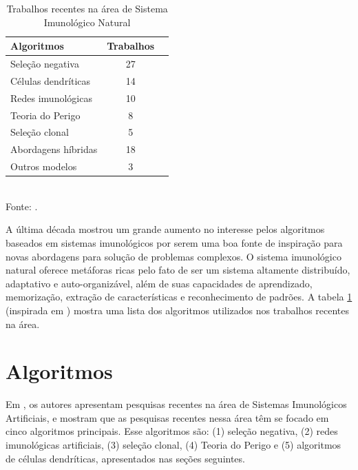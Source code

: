 \vspace{0.5cm}
\begin{table}[h]
    \centering
    \caption{Trabalhos recentes na área de Sistema Imunológico Natural}
    \label{ais:recent}
    \vspace{0.5cm}
    \begin{tabular}{l c r}
        \hline
        Algoritmos & Trabalhos   \\
        \hline
        Seleção negativa    & 27 \\
        Células dendríticas & 14 \\
        Redes imunológicas  & 10 \\
        Teoria do Perigo    & 8  \\
        Seleção clonal      & 5  \\
        Abordagens híbridas & 18 \\
        Outros modelos      & 3  \\
        \hline
    \end{tabular}
    \vspace{0.5cm}
    \\ Fonte: \citet{Dasgupta2010}.
\end{table}
\vspace{0.5cm}

A última década mostrou um grande aumento no interesse pelos algoritmos baseados em sistemas imunológicos por serem uma boa fonte de inspiração para novas abordagens para solução de problemas complexos. O sistema imunológico natural oferece metáforas ricas pelo fato de ser um sistema altamente distribuído, adaptativo e auto-organizável, além de suas capacidades de aprendizado, memorização, extração de características e reconhecimento de padrões. A tabela \ref{ais:recent} (inspirada em \citet{Dasgupta2010}) mostra uma lista dos algoritmos utilizados nos trabalhos recentes na área.

\section{Algoritmos}

Em \citet{Dasgupta2010}, os autores apresentam pesquisas recentes na área de Sistemas Imunológicos Artificiais, e mostram que as pesquisas recentes nessa área têm se focado em cinco algoritmos principais. Esse algoritmos são: (1) seleção negativa, (2) redes imunológicas artificiais, (3) seleção clonal, (4) Teoria do Perigo e (5) algoritmos de células dendríticas, apresentados nas seções seguintes.

